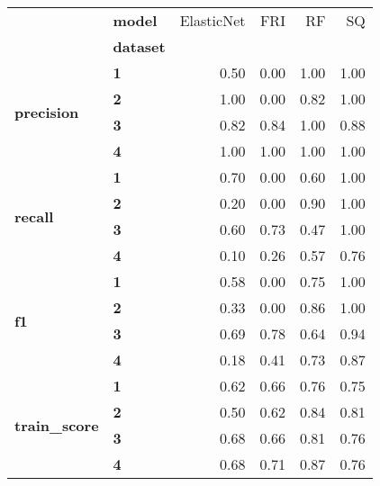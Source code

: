 \begin{tabular}{llrrrr}
\toprule
            & \textbf{model} &  ElasticNet &  FRI &   RF &   SQ \\
{} & \textbf{dataset} &             &      &      &      \\
\midrule
\multirow{4}{*}{\textbf{precision}} & \textbf{1} &        0.50 & 0.00 & 1.00 & 1.00 \\
            & \textbf{2} &        1.00 & 0.00 & 0.82 & 1.00 \\
            & \textbf{3} &        0.82 & 0.84 & 1.00 & 0.88 \\
            & \textbf{4} &        1.00 & 1.00 & 1.00 & 1.00 \\
\cline{1-6}
\multirow{4}{*}{\textbf{recall}} & \textbf{1} &        0.70 & 0.00 & 0.60 & 1.00 \\
            & \textbf{2} &        0.20 & 0.00 & 0.90 & 1.00 \\
            & \textbf{3} &        0.60 & 0.73 & 0.47 & 1.00 \\
            & \textbf{4} &        0.10 & 0.26 & 0.57 & 0.76 \\
\cline{1-6}
\multirow{4}{*}{\textbf{f1}} & \textbf{1} &        0.58 & 0.00 & 0.75 & 1.00 \\
            & \textbf{2} &        0.33 & 0.00 & 0.86 & 1.00 \\
            & \textbf{3} &        0.69 & 0.78 & 0.64 & 0.94 \\
            & \textbf{4} &        0.18 & 0.41 & 0.73 & 0.87 \\
\cline{1-6}
\multirow{4}{*}{\textbf{train\_score}} & \textbf{1} &        0.62 & 0.66 & 0.76 & 0.75 \\
            & \textbf{2} &        0.50 & 0.62 & 0.84 & 0.81 \\
            & \textbf{3} &        0.68 & 0.66 & 0.81 & 0.76 \\
            & \textbf{4} &        0.68 & 0.71 & 0.87 & 0.76 \\
\bottomrule
\end{tabular}
